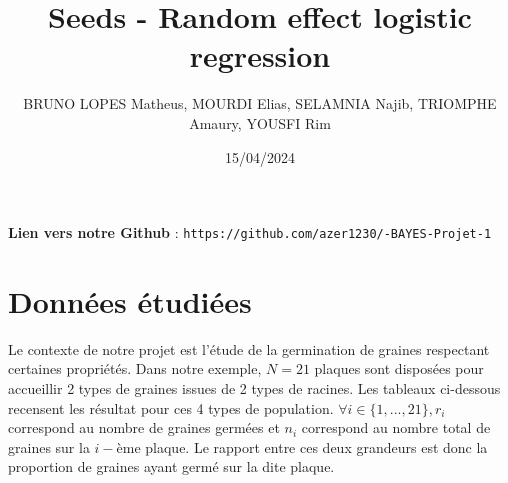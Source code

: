 \documentclass[
]{article}
\title{Seeds - Random effect logistic regression}
\author{BRUNO LOPES Matheus, MOURDI Elias, SELAMNIA Najib, TRIOMPHE
Amaury, YOUSFI Rim}
\date{15/04/2024}
\begin{document}
\maketitle

\textbf{Lien vers notre Github} :
\texttt{https://github.com/azer1230/-BAYES-Projet-1}

\hypertarget{donnuxe9es-uxe9tudiuxe9es}{%
\section{Données étudiées}\label{donnuxe9es-uxe9tudiuxe9es}}

Le contexte de notre projet est l'étude de la germination de graines
respectant certaines propriétés. Dans notre exemple, \(N = 21\) plaques
sont disposées pour accueillir 2 types de graines issues de 2 types de
racines. Les tableaux ci-dessous recensent les résultat pour ces 4 types
de population. \(\forall i \in \{1,...,21\}, r_i\) correspond au nombre
de graines germées et \(n_i\) correspond au nombre total de graines sur
la \(i-\)ème plaque. Le rapport entre ces deux grandeurs est donc la
proportion de graines ayant germé sur la dite plaque.
\end{document}
